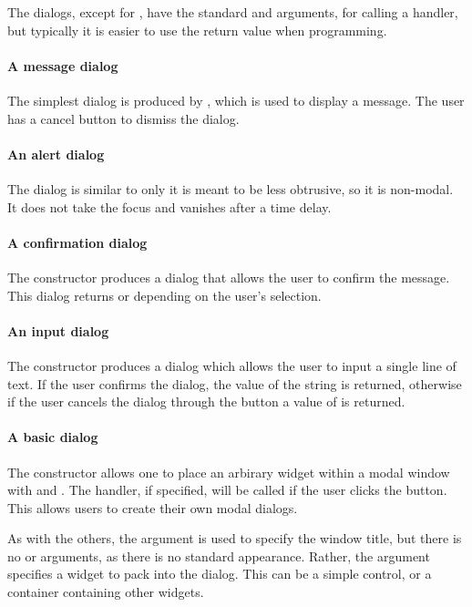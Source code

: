 The dialogs, except for , have the standard
 and  arguments, for calling a handler, but
typically it is easier to use the return value when programming.

\paragraph{A message dialog}
The simplest dialog is produced by , which is used to
display a message. The user has a cancel button to dismiss the dialog.

\paragraph{An alert dialog}
The  dialog is similar to  only it is meant
to be less obtrusive, so it is non-modal. It does not take the focus and vanishes after a time delay.

\paragraph{A confirmation dialog}
The constructor  produces a dialog that allows
the user to confirm the message. This dialog returns  or
 depending on the user's selection.


\paragraph{An input dialog}
The  constructor produces a dialog which allows
the user to input a single line of text. If the user confirms the
dialog, the value of the string is returned, otherwise if the user
cancels the dialog through the button a value of  is returned.




\paragraph{A basic dialog}
The  constructor allows one to place an
arbirary widget within a modal window with  and
. The handler, if specified, will be called if the user
clicks the  button. This allows users to create their own
modal dialogs.

As with the others, the argument  is
used to specify the window title, but there is no  or
 arguments, as there is no standard appearance. Rather,
the  argument specifies a widget to
pack into the dialog. This can be a simple control, or a container
containing other widgets. 

